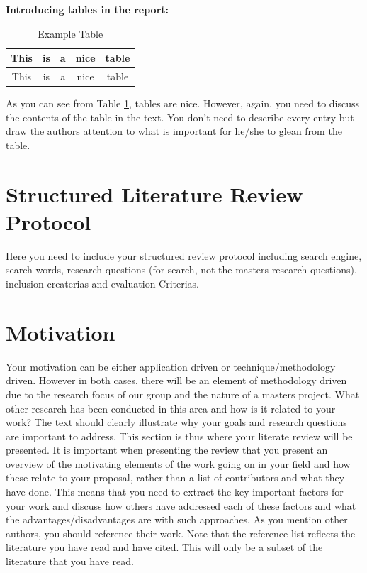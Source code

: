 \documentclass[a4paper]{book}
\begin{document}
\vspace{0.5cm}

\noindent
{\bf Introducing tables in the report: }\\

\begin{table}[htbp]
    \begin{center}
        \begin{tabular}{|c|c|c|c|c|}\hline\hline
            This & is & a & nice & table \\\hline
            This & is & a & nice & table \\\hline\hline
        \end{tabular}
        \caption{Example Table}
    \end{center}
    \label{tab:ExampleTable}
\end{table}%

As you can see from Table \ref{tab:ExampleTable}, tables are nice. However, again, you need to discuss the contents of the table in the text. You don't need to describe every entry but draw the authors attention to what is important for he/she to glean from the table.

\section{Structured Literature Review Protocol}

Here you need to include your structured review protocol including search engine, search words, research questions  (for search, not the masters research questions), inclusion createrias and evaluation Criterias.

\section{Motivation}
\label{sec:no2}

Your motivation can be either application driven or technique/methodology driven. However in both cases, there will be an element of methodology driven due to the research focus of our group and the nature of a masters project.
What other research has been conducted in this area and how is it related to your work? The text should clearly illustrate why your goals and research questions are important to address. This section is thus where your literate review will be presented. It is important when presenting the review that you present an overview of the motivating elements of the work going on in your field and how these relate to your proposal, rather than a list of contributors and what they have done. This means that you need to extract the key important factors for your work and discuss how others have addressed each of these factors and what the advantages/disadvantages are with such approaches. As you mention other authors, you should reference their work. Note that the reference list reflects the literature you have read and have cited. This will only be a subset of the literature that you have read.
\end{document}

